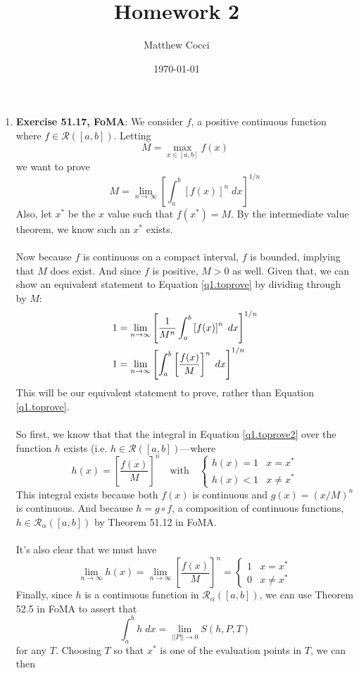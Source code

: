 \documentclass[12pt]{article}
\author{Matthew Cocci}
\title{\textbf{Homework 2}}
\date{\today}
\theoremstyle{plain}
\theoremstyle{definition}
\theoremstyle{remark}
\begin{document}
\maketitle

\begin{enumerate}
\item \textbf{Exercise 51.17, FoMA}: We consider $f$, a positive continuous function where $f  \in \mathscr{R}([a,b])$. Letting 
    \[ M = \max_{x \in [a,b]} f(x) \]
we want to prove 
\begin{equation}
    \label{q1.toprove}
    M = 
    \lim_{n\rightarrow\infty} \left[\int^b_a \left[f(x)\right]^n
        \; dx\right]^{1/n}
\end{equation}
Also, let $x^*$ be the $x$ value such that $f(x^*)=M$. By the intermediate value theorem, we know such an $x^*$ exists.
\\
\\
Now because $f$ is continuous on a compact interval, $f$ is bounded, implying that $M$ does exist. And since $f$ is positive, $M>0$ as well. Given that, we can show an equivalent statement to Equation \ref{q1.toprove} by dividing through by $M$:
\begin{align}
    1 &= \lim_{n\rightarrow\infty} \left[\frac{1}{M^n} \int^b_a 
        \left[f(x)\right]^n \; dx\right]^{1/n} \notag \\
    1 &= \lim_{n\rightarrow\infty} \left[ \int^b_a 
        \left[\frac{f(x)}{M}\right]^n \; dx\right]^{1/n} 
        \label{q1.toprove2}
\end{align}
This will be our equivalent statement to prove, rather than Equation \ref{q1.toprove}.
\\
\\
So first, we know that that the integral in Equation \ref{q1.toprove2} over the function $h$ exists (i.e. $h \in \mathscr{R}([a,b])$---where
    \[ h(x) = \left[\frac{f(x)}{M}\right]^n 
        \quad \text{with} \quad 
        \begin{cases} h(x) = 1 & x=x^* \\ h(x) < 1 & x\neq x^* 
        \end{cases}\]
This integral exists because both $f(x)$ is continuous and $g(x) = \left(x/M\right)^n$ is continuous. And because $h = g \circ f$, a composition of continuous functions, $h \in \mathscr{R}_\alpha([a,b])$ by Theorem 51.12 in FoMA. 
\\
\\
It's also clear that we must have
\begin{equation}
    \lim_{n\rightarrow\infty} h(x) =  
    \lim_{n\rightarrow\infty}\left[\frac{f(x)}{M}\right]^n
    = \begin{cases} 1 & x = x^* \\ 0 & x \neq x^*
      \end{cases} 
\end{equation}
Finally, since $h$ is a continuous function in $\mathscr{R}_\alpha([a,b])$, we can use Theorem 52.5 in FoMA to assert that
    \[ \int^b_a h \; dx = \lim_{||P||\rightarrow 0}
        S(h,P,T) \]
for any $T$. Choosing $T$ so that $x^*$ is one of the evaluation points in $T$, we can then


\end{enumerate}
\end{document}
